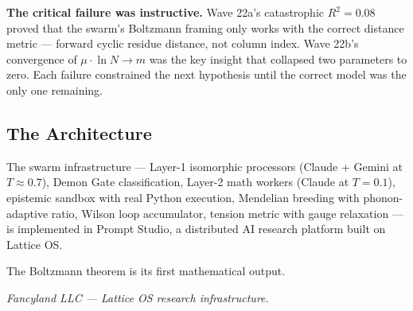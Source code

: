 \documentclass[
  11pt,
]{article}
\begin{document}
\textbf{The critical failure was instructive.} Wave 22a's catastrophic
\(R^2 = 0.08\) proved that the swarm's Boltzmann framing only works with
the correct distance metric --- forward cyclic residue distance, not
column index. Wave 22b's convergence of \(\mu \cdot \ln N \to m\) was
the key insight that collapsed two parameters to zero. Each failure
constrained the next hypothesis until the correct model was the only one
remaining.

\subsection{The Architecture}\label{sec:architecture}

The swarm infrastructure --- Layer-1 isomorphic processors (Claude +
Gemini at \(T \approx 0.7\)), Demon Gate classification, Layer-2 math
workers (Claude at \(T = 0.1\)), epistemic sandbox with real Python
execution, Mendelian breeding with phonon-adaptive ratio, Wilson loop
accumulator, tension metric with gauge relaxation --- is implemented in
Prompt Studio, a distributed AI research platform built on Lattice OS.

The Boltzmann theorem is its first mathematical output.

\vspace{1em}
\noindent\emph{Fancyland LLC --- Lattice OS research infrastructure.}
\end{document}
